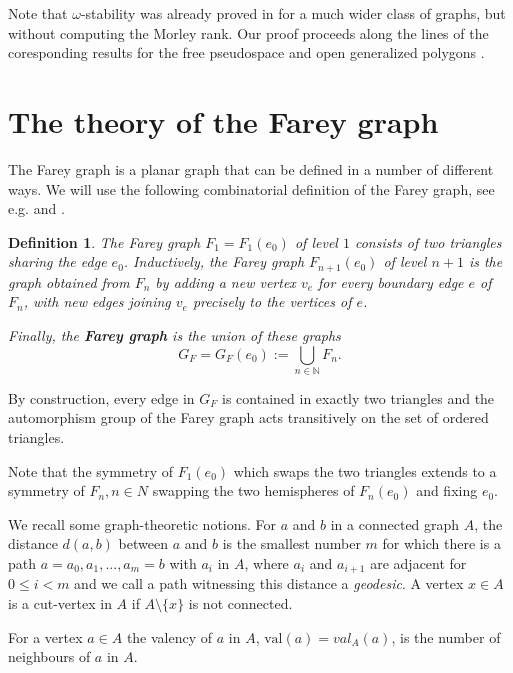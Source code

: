 \documentclass{amsart}
\newcommand{\val}{\mathrm{val}}
\newtheorem{definition}[defi]{Definition}
\begin{document}
Note that $\omega$-stability was already  proved  in \cite{modeltheorycurvegraph} for a much wider class of graphs, but without computing the Morley rank.
Our proof proceeds along the lines of the coresponding results for the free pseudospace \cite{TENT_2014} and open generalized polygons \cite{AmmerTent2024}.



\section{The theory of the Farey graph}



The Farey graph is a planar graph that can be defined in a number of different ways. We will use the following
combinatorial definition of the Farey graph, see e.g. \cite{office_hours} and \cite{KURKOFKA2021223}.

\begin{definition}
    The Farey graph $F_1=F_1(e_0)$ of level $1$ consists of two triangles sharing the edge $e_0$.
    Inductively, the Farey graph $F_{n+1}(e_0)$ of level $n + 1$ is the graph obtained from $F_n$ by adding a new vertex $v_e$ for every boundary edge $e$ of $F_{n}$,
    with new edges joining $v_e$ precisely to the vertices of $e$.


    Finally, the \textbf{Farey graph} is the union of these  graphs \[G_F =G_F(e_0):= \bigcup_{n \in \mathbb{N}} F_n.\]

\end{definition}

By construction, every edge in $G_F$ is contained in exactly two triangles and the automorphism group of the Farey graph acts transitively on the set of ordered triangles. 


Note that the symmetry of $F_1(e_0)$ which swaps the two triangles extends to  a symmetry of $F_n, n\in N$  swapping the two hemispheres of $F_n(e_0)$ and fixing $e_0$.
    

We  recall some graph-theoretic notions. 
For $a$ and $b$ in a connected graph $A$, the distance $d(a, b)$ between $a$ and $b$ is the smallest number 
$m$ for which there is a path $a = a_0, a_1, ..., a_m = b$ with $a_i$ in $A$, where 
$a_i$ and $a_{i+1}$ are adjacent for $0 \leq i < m$ and we call a path witnessing this distance a \emph{geodesic}. A vertex $x\in A$ is a cut-vertex in $A$ if $A\setminus\{x\}$ is not connected.

For a vertex $a \in A$ the valency of $a$ in $A$,
 $\val(a)=val_A(a)$, is the number of neighbours of $a$ in $A$.
 
\end{document}
